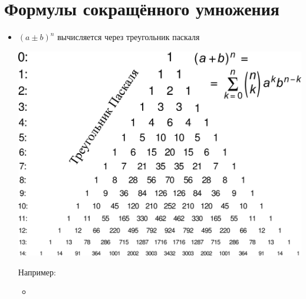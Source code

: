 \section{Формулы сокращённого умножения}
\begin{itemize}
	\item $(a \pm b)^n$ вычисляется через треугольник паскаля\\
	\begin{center}
		\includegraphics[scale=0.2]{./mh/algebra/rational_expressions/Pascal_triangle.png}
	\end{center}
	Например:\\
	\begin{itemize}
		\item 
	\end{itemize}
\end{itemize}